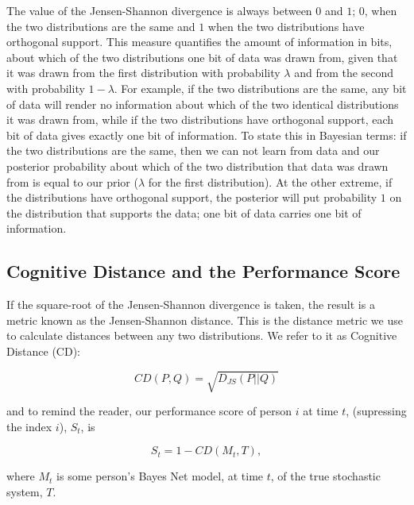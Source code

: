 The value of the Jensen-Shannon divergence is always between $0$ and $1$; $0$, when the two distributions are the same and $1$ when the two distributions have orthogonal support. This measure quantifies the amount of information in bits, about which of the two distributions one bit of data was drawn from, given that it was drawn from the first distribution with probability $\lambda$ and from the second with probability $1-\lambda$. For example, if the two distributions are the same, any bit of data will render no information about which of the two identical distributions it was drawn from, while if the two distributions have orthogonal support, each bit of data gives exactly one bit of information. To state this in Bayesian terms: if the two distributions are the same, then we can not learn from data and our posterior probability about which of the two distribution that data was drawn from is equal to our prior ($\lambda$ for the first distribution). At the other extreme, if the distributions have orthogonal support, the posterior will put probability $1$ on the distribution that supports the data; one bit of data carries one bit of information. 

\subsection{Cognitive Distance and the Performance Score}

If the square-root of the Jensen-Shannon divergence is taken, the result is a metric known as the Jensen-Shannon distance. This is the distance metric we use to calculate distances between any two distributions.  We refer to it as Cognitive Distance (CD):

\begin{equation}
CD(P, Q) = \sqrt{D_{JS}(P | | Q)}
\end{equation}

and to remind the reader, our performance score of person $i$ at time $t$, (supressing the index $i$), $S_t$, is 

\begin{equation}
S_t = 1 - CD(M_t, T),
\end{equation}

where $M_t$ is some person's Bayes Net model, at time $t$, of the true stochastic system, $T$. 
